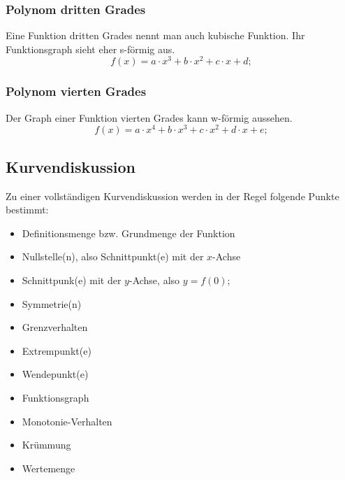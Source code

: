 \documentclass[a4paper]{article}
\begin{document}
\subsubsection{Polynom dritten Grades}
Eine Funktion dritten Grades nennt man auch kubische Funktion.
Ihr Funktionsgraph sieht eher s-f\"ormig aus.
\[
	f(x) = a \cdot x^3 + b \cdot x^2 + c \cdot x + d ;
\]

\subsubsection{Polynom vierten Grades}
Der Graph einer Funktion vierten Grades kann w-f\"ormig aussehen.
\[
	f(x) = a \cdot x^4  + b \cdot x^3 + c \cdot x^2 + d \cdot x + e ;
\]


\subsection{Kurvendiskussion}
Zu einer vollst\"andigen Kurvendiskussion werden in der Regel folgende Punkte bestimmt:
\begin{itemize}[nosep]
	\item Definitionsmenge bzw. Grundmenge der Funktion
	\item Nullstelle(n), also Schnittpunkt(e) mit der $x$-Achse
	\item Schnittpunk(e) mit der $y$-Achse, also $ y = f(0) ; $
	\item Symmetrie(n)
	\item Grenzverhalten
	\item Extrempunkt(e)
	\item Wendepunkt(e)
	\item Funktionsgraph
	\item Monotonie-Verhalten
	\item Kr\"ummung
	\item Wertemenge
\end{itemize}
\end{document}
